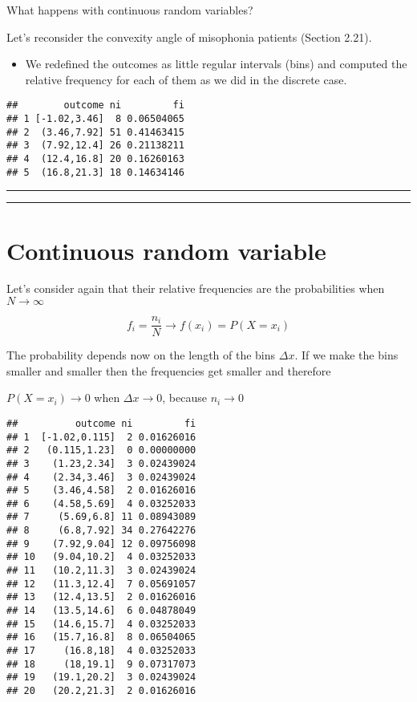 \documentclass[
]{book}
\providecommand{\tightlist}{%
  \setlength{\itemsep}{0pt}\setlength{\parskip}{0pt}}
\begin{document}
What happens with continuous random variables?

Let's reconsider the convexity angle of misophonia patients (Section 2.21).

\begin{itemize}
\tightlist
\item
  We redefined the outcomes as little regular intervals (bins) and computed the relative frequency for each of them as we did in the discrete case.
\end{itemize}

\begin{verbatim}
##        outcome ni         fi
## 1 [-1.02,3.46]  8 0.06504065
## 2  (3.46,7.92] 51 0.41463415
## 3  (7.92,12.4] 26 0.21138211
## 4  (12.4,16.8] 20 0.16260163
## 5  (16.8,21.3] 18 0.14634146
\end{verbatim}

\begin{center}\rule{0.5\linewidth}{0.5pt}\end{center}

\begin{center}\rule{0.5\linewidth}{0.5pt}\end{center}

\hypertarget{continuous-random-variable-1}{%
\section{Continuous random variable}\label{continuous-random-variable-1}}

Let's consider again that their relative frequencies are the probabilities when \(N \rightarrow \infty\)

\[f_i=\frac{n_i}{N} \rightarrow f(x_i)=P(X=x_i)\]

The probability depends now on the length of the bins \(\Delta x\). If we make the bins smaller and smaller then the frequencies get smaller and therefore

\(P(X=x_i) \rightarrow 0\) when \(\Delta x \rightarrow 0\), because \(n_i \rightarrow 0\)

\begin{verbatim}
##          outcome ni         fi
## 1  [-1.02,0.115]  2 0.01626016
## 2   (0.115,1.23]  0 0.00000000
## 3    (1.23,2.34]  3 0.02439024
## 4    (2.34,3.46]  3 0.02439024
## 5    (3.46,4.58]  2 0.01626016
## 6    (4.58,5.69]  4 0.03252033
## 7     (5.69,6.8] 11 0.08943089
## 8     (6.8,7.92] 34 0.27642276
## 9    (7.92,9.04] 12 0.09756098
## 10   (9.04,10.2]  4 0.03252033
## 11   (10.2,11.3]  3 0.02439024
## 12   (11.3,12.4]  7 0.05691057
## 13   (12.4,13.5]  2 0.01626016
## 14   (13.5,14.6]  6 0.04878049
## 15   (14.6,15.7]  4 0.03252033
## 16   (15.7,16.8]  8 0.06504065
## 17     (16.8,18]  4 0.03252033
## 18     (18,19.1]  9 0.07317073
## 19   (19.1,20.2]  3 0.02439024
## 20   (20.2,21.3]  2 0.01626016
\end{verbatim}
\end{document}

